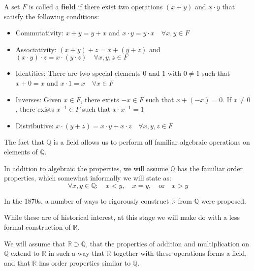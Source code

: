 \par\vspace{0.3 cm}
\begin{definition}[field] A set $F$ is called a \textbf{field} if there exist two operations $(x+y)$ and $x\cdot y$ that satisfy the following conditions:
\begin{itemize} 
\item Commutativity: $x+y=y+x$ and $x\cdot y = y\cdot x\quad\forall x,y\in F$ 
\item Associativity: $(x+y)+z=x+(y+z)$ and $(x\cdot y)\cdot z=x\cdot(y\cdot z)\quad\forall x,y,z\in F$
\item Identities: There are two special elements $0$ and $1$ with $0\neq1$ such that $x+0=x$ and $x\cdot1=x\quad\forall x\in F$
\item Inverses: Given $x\in F$, there exists $-x\in F$ such that $x+(-x)=0$.  If $x\neq0$, there exists $x^{-1}\in F$ such that $x\cdot x^{-1}=1$
\item Distributive: $x\cdot(y+z) = x\cdot y+ x\cdot z\quad\forall x,y,z\in F$ 
\end{itemize}
\end{definition}
\par\vspace{0.3 cm}
The fact that $\mathbb{Q}$ is a field allows us to perform all familiar algebraic operations on elements of $\mathbb{Q}$.
\par\vspace{0.3 cm}
In addition to algebraic the properties, we will assume $\mathbb{Q}$ has the familiar order properties, which somewhat informally we will state as:
\[
\forall x,y\in\mathbb{Q}:\quad x<y,\quad x=y,\quad\mbox{or}\quad x>y
\] 
\par\vspace{0.3 cm}
In the 1870s, a number of ways to rigorously construct $\mathbb{R}$ from $\mathbb{Q}$ were proposed.  
\par\vspace{0.3 cm}
While these are of historical interest, at this stage we will make do with a less formal construction of $\mathbb{R}$.
\par\vspace{0.3 cm}
We will assume that $\mathbb{R}\supset\mathbb{Q}$, that the properties of addition and multiplication on $\mathbb{Q}$ extend to $\mathbb{R}$ in such a way that $\mathbb{R}$ together with these operations forms a field, and that $\mathbb{R}$ has order properties similar to $\mathbb{Q}$.
\par\vspace{0.3 cm}
